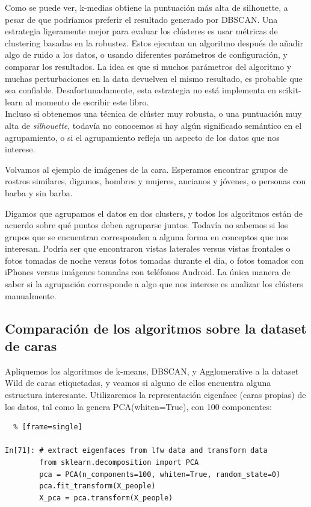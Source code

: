 Como se puede ver, k-medias  obtiene la puntuación más alta de silhouette, a pesar de que podríamos  preferir el resultado generado por DBSCAN. Una estrategia ligeramente mejor para evaluar los clústeres es usar métricas de clustering basadas en la robustez.  Estos ejecutan un algoritmo después de añadir algo de ruido a los datos, o usando diferentes parámetros de configuración, y comparar los resultados. La idea es que si muchos parámetros del algoritmo y muchas perturbaciones en la data  devuelven el mismo resultado, es probable que sea confiable.  Desafortunadamente, esta estrategia no está implementa en {\ttfamily scikit-learn} al momento de escribir este libro.\\

 Incluso si obtenemos una técnica de  clúster muy robusta, o una puntuación  muy alta de \emph{silhouette}, todavía no conocemos si hay algún significado semántico en el agrupamiento, o si el agrupamiento
refleja un aspecto de los datos que nos interese.  

Volvamos al ejemplo de imágenes de la cara.  Esperamos encontrar grupos de rostros similares, digamos, hombres y mujeres, ancianos y jóvenes, o personas con barba y sin barba.

Digamos que agrupamos el datos en dos clusters,  y todos los algoritmos están de acuerdo sobre qué puntos deben agruparse juntos.  Todavía no sabemos si los grupos que se encuentran corresponden a alguna forma en conceptos que nos interesan. Podría ser que encontraron vistas laterales versus vistas frontales o fotos tomadas de noche versus fotos tomadas durante el día, o fotos tomados con iPhones versus imágenes tomadas con teléfonos Android.  La única manera de saber si la agrupación corresponde a algo que nos interese es analizar  los clústers manualmente. 
 

\subsection{Comparación de los algoritmos sobre la dataset de caras}


Apliquemos los algoritmos de k-means, DBSCAN, y Agglomerative a la dataset Wild  de caras  etiquetadas, y veamos si alguno de ellos encuentra alguna estructura interesante. Utilizaremos la representación eigenface (caras propias) de los datos, tal como la genera {\ttfamily PCA(whiten=True)}, con 100 componentes:


\begin{lstlisting}  % [frame=single]	

In[71]: # extract eigenfaces from lfw data and transform data
        from sklearn.decomposition import PCA
        pca = PCA(n_components=100, whiten=True, random_state=0)
        pca.fit_transform(X_people)
        X_pca = pca.transform(X_people)


\end{lstlisting} 


